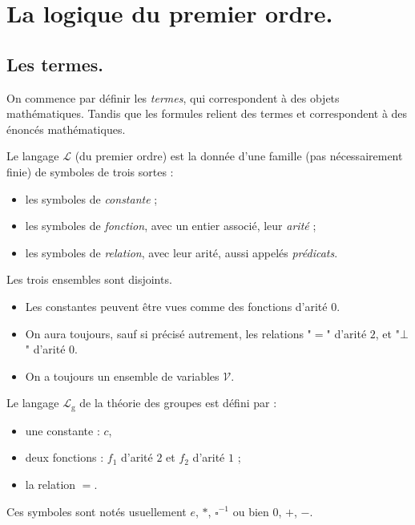 \documentclass[./main]{subfiles}
\begin{document}
  \chapter{La logique du premier ordre.}

  \section{Les termes.}

  On commence par définir les \textit{termes}, qui correspondent à des objets mathématiques.
  Tandis que les formules relient des termes et correspondent à des énoncés mathématiques.

  \begin{defn}
    Le langage $\mathcal{L}$ (du premier ordre)
    est la donnée d'une famille (pas nécessairement finie) de symboles de trois sortes :
    \begin{itemize}
      \item les symboles de \textit{constante} ;
      \item les symboles de \textit{fonction}, avec un entier associé, leur \textit{arité} ;
      \item les symboles de \textit{relation}, avec leur arité, aussi appelés \textit{prédicats}.
    \end{itemize}
    Les trois ensembles sont disjoints.
  \end{defn}

  \begin{rmk}
    \begin{itemize}
      \item Les constantes peuvent être vues comme des fonctions d'arité $0$.
      \item On aura toujours, sauf si précisé autrement, les relations "$=$" d'arité $2$, et "$\bot$" d'arité $0$.
      \item On a toujours un ensemble de variables $\mathcal{V}$.
    \end{itemize}
  \end{rmk}

  \begin{exm}
    Le langage $\mathcal{L}_\mathrm{g}$ de la théorie des groupes est défini par :
    \begin{itemize}
      \item une constante : $c$,
      \item deux fonctions : $f_1$ d'arité $2$ et $f_2$ d'arité $1$ ;
      \item la relation $=$.
    \end{itemize}
    Ces symboles sont notés usuellement $e$, $*$, $\square^{-1}$ ou bien $0$, $+$, $-$.
  \end{exm}
\end{document}
